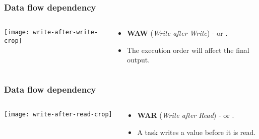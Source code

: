\begin{frame}
  \frametitle{Data flow dependency}
  \begin{columns}
  \begin{column}{0.4\textwidth}
	\texttt{[image: write-after-write-crop]}
  \end{column}
  \begin{column}{0.6\textwidth}
    \begin{itemize}
    \item \textbf{WAW} (\emph{Write after Write}) - or .
    \item The execution order will affect the final output.
    \end{itemize}
  \end{column}
  \end{columns}
\end{frame}
\begin{frame}
  \frametitle{Data flow dependency}
  \begin{columns}
  \begin{column}{0.4\textwidth}
	\texttt{[image: write-after-read-crop]}
  \end{column}
  \begin{column}{0.6\textwidth}
    \begin{itemize}
    \item \textbf{WAR} (\emph{Write after Read}) - or .
    \item A task writes a value before it is read.
    \end{itemize}
  \end{column}
  \end{columns}
\end{frame}
